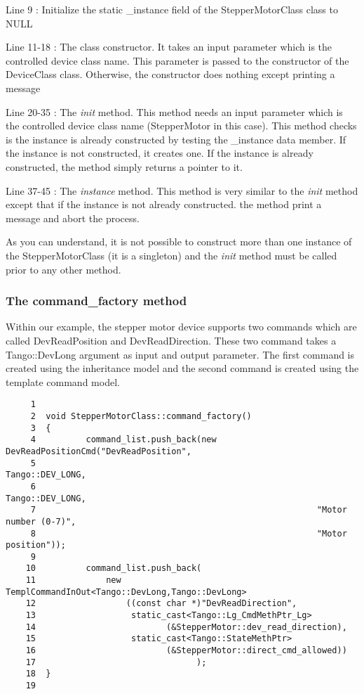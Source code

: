 Line 9 : Initialize the static \_instance field of the StepperMotorClass
class to NULL

Line 11-18 : The class constructor. It takes an input parameter which
is the controlled device class name. This parameter is passed to the
constructor of the DeviceClass class. Otherwise,
the constructor does nothing except printing a message

Line 20-35 : The \emph{init} method. This method needs
an input parameter which is the controlled device class name (StepperMotor
in this case). This method checks is the instance is already constructed
by testing the \_instance data member. If the instance is not constructed,
it creates one. If the instance is already constructed, the method
simply returns a pointer to it.

Line 37-45 : The \emph{instance} method. This method is very similar
to the \emph{init} method except that if the instance is not already
constructed. the method print a message and abort the process.

As you can understand, it is not possible to construct more than one
instance of the StepperMotorClass (it is a singleton)
and the \emph{init} method must be called prior to any other method.


\subsubsection{The command\_factory method}

Within our example, the stepper motor device supports two commands
which are called DevReadPosition and DevReadDirection. These two command
takes a Tango::DevLong argument as input and output parameter. The
first command is created using the inheritance
model and the second command is created using the template
command model.


\begin{verbatim}
     1  
     2  void StepperMotorClass::command_factory()
     3  {
     4          command_list.push_back(new DevReadPositionCmd("DevReadPosition",
     5                                                        Tango::DEV_LONG,
     6                                                        Tango::DEV_LONG,
     7                                                        "Motor number (0-7)",
     8                                                        "Motor position"));
     9                                                        
    10          command_list.push_back(
    11              new TemplCommandInOut<Tango::DevLong,Tango::DevLong>
    12                  ((const char *)"DevReadDirection",
    13                   static_cast<Tango::Lg_CmdMethPtr_Lg>
    14                          (&StepperMotor::dev_read_direction),
    15                   static_cast<Tango::StateMethPtr>
    16                          (&StepperMotor::direct_cmd_allowed))
    17                                );
    18  }
    19  
\end{verbatim}


